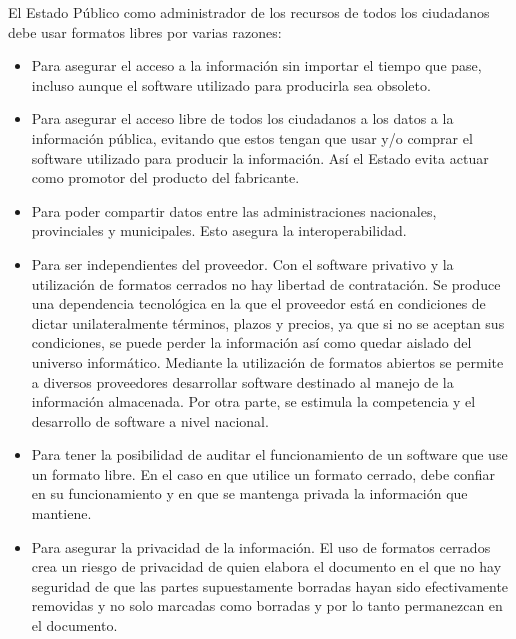 \documentclass[12pt]{article}
\begin{document}
El Estado Público como administrador de los recursos de todos los ciudadanos debe usar formatos libres por varias razones:
\begin{itemize}
\item Para asegurar el acceso a la información sin importar el tiempo que pase, incluso aunque el software utilizado para producirla sea obsoleto.

\item Para asegurar el acceso libre de todos los ciudadanos a los datos a la información pública, evitando que estos tengan que usar y/o comprar el software utilizado para producir la información. Así el Estado evita actuar como promotor del producto del fabricante.

\item Para poder compartir datos entre las administraciones nacionales, provinciales y municipales. Esto asegura la interoperabilidad.

\item Para ser independientes del proveedor. Con el software privativo y la utilización de formatos cerrados no hay libertad de contratación. Se produce una dependencia tecnológica en la que el proveedor está en condiciones de dictar unilateralmente términos, plazos y precios, ya que si no se aceptan sus condiciones, se puede perder la información así como quedar aislado del universo informático. Mediante la utilización de formatos abiertos se permite a diversos proveedores desarrollar software destinado al manejo de la información almacenada. Por otra parte, se estimula la competencia y el desarrollo de software a nivel nacional.

\item Para tener la posibilidad de auditar el funcionamiento de un software que use un formato libre. En el caso en que utilice un formato cerrado, debe confiar en su funcionamiento y en que se mantenga privada la información que mantiene.

\item Para asegurar la privacidad de la información. El uso de formatos cerrados crea un riesgo de privacidad de quien elabora el documento en el que no hay seguridad de que las partes supuestamente borradas hayan sido efectivamente removidas y no solo marcadas como borradas y por lo tanto permanezcan en el documento. 

\end{itemize}
\end{document}
